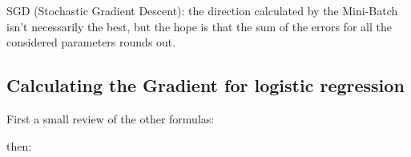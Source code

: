 SGD (Stochastic Gradient Descent): the direction calculated by the Mini-Batch isn't necessarily the best, but the hope is that the sum of the errors for all the considered parameters rounds out.


\subsection{Calculating the Gradient for logistic regression}
First a small review of the other formulas:

then:

